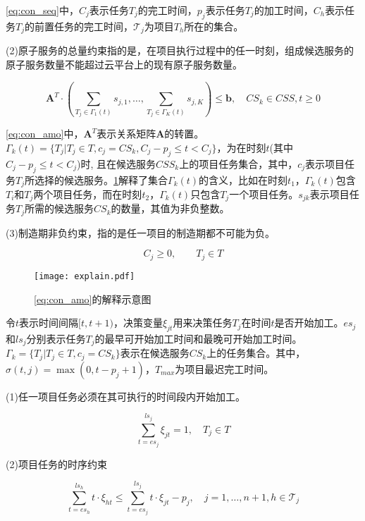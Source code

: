 \documentclass[UTF8]{ctexart}
\begin{document}
\cref{eq:con_seq}中，$C_j$表示任务$T_j$的完工时间，$p_j$表示任务$T_j$的加工时间，$C_h$表示任务$T_j$的前置任务的完工时间，$\mathcal{T}_j$为项目$T_h$所在的集合。

(2)原子服务的总量约束指的是，在项目执行过程中的任一时刻，组成候选服务的原子服务数量不能超过云平台上的现有原子服务数量。

\begin{equation}
\label{eq:con_amo}
\bm{A}^T \cdot \left(\sum_{T_j\in\Gamma_1(t)}s_{j,1},\dots, \sum_{T_j\in\Gamma_K(t)}s_{j,K} \right) \leqslant \bm{b}, \quad CS_k \in CSS, t \geqslant 0
\end{equation}

\cref{eq:con_amo}中，$\bm{A}^T$表示关系矩阵$\bm{A}$的转置。$\Gamma_k(t)=\{T_j|T_j\in T,c_j=CS_k, C_j-p_j\leqslant t < C_j\}$，为在时刻$t$(其中$C_j-p_j\leqslant t < C_j$)时, 且在候选服务$CSS_k$上的项目任务集合，其中，$c_j$表示项目任务$T_j$所选择的候选服务。\cref{fig:explain}解释了集合$\Gamma_k(t)$的含义，比如在时刻$t_1$，$\Gamma_k(t)$包含$T_i$和$T_j$两个项目任务，而在时刻$t_2$，$\Gamma_k(t)$只包含$T_j$一个项目任务。$s_{jk}$表示项目任务$T_j$所需的候选服务$CS_k$的数量，其值为非负整数。

(3)制造期非负约束，指的是任一项目的制造期都不可能为负。

\begin{equation}
\label{eq:con_completion_time}
C_j \geqslant 0, \qquad  T_j \in T
\end{equation}

\begin{figure}
\centering
\texttt{[image: explain.pdf]}
\caption{\cref{eq:con_amo}的解释示意图}
\label{fig:explain}
\end{figure}

令$t$表示时间间隔$[t,t+1)$，决策变量$\xi_{jt}$用来决策任务$T_j$在时间$t$是否开始加工。$es_j$和$ls_j$分别表示任务$T_j$的最早可开始加工时间和最晚可开始加工时间。$\Gamma_k=\{T_j|T_j \in T, c_j = CS_k\}$表示在候选服务$CS_k$上的任务集合。其中，$\sigma(t,j)=\max(0,t-p_j+1)$，$T_{max}$为项目最迟完工时间。

(1)任一项目任务必须在其可执行的时间段内开始加工。

\begin{equation}
\label{eq:ip_dec_val}
\sum_{t = es_j}^{ls_j} \xi_{jt} = 1, \quad T_j \in T
\end{equation}

(2)项目任务的时序约束

\begin{equation}
\label{eq:ip_seq}
\sum_{t=es_h}^{ls_h} t\cdot\xi_{ht} \leqslant \sum_{t=es_j}^{ls_j} t\cdot\xi_{jt} - p_j, \quad  j = 1,\dots,n+1, h\in \mathcal{T}_j
\end{equation}
\end{document}
